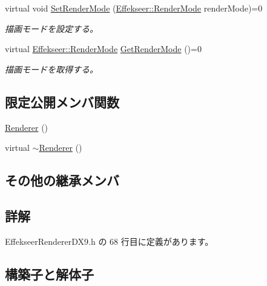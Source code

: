\begin{DoxyCompactItemize}
virtual void \mbox{\hyperlink{class_effekseer_renderer_1_1_renderer_ab0805785cad223b4a79d2d16fcd9bec8}{Set\+Render\+Mode}} (\mbox{\hyperlink{namespace_effekseer_ad1b82893021dd8e3697e46c1aa544092}{Effekseer\+::\+Render\+Mode}} render\+Mode)=0
\begin{DoxyCompactList}\small\item\em 描画モードを設定する。 \end{DoxyCompactList}\item 
virtual \mbox{\hyperlink{namespace_effekseer_ad1b82893021dd8e3697e46c1aa544092}{Effekseer\+::\+Render\+Mode}} \mbox{\hyperlink{class_effekseer_renderer_1_1_renderer_a45fd7eb7a8796aeb67467511891a48fd}{Get\+Render\+Mode}} ()=0
\begin{DoxyCompactList}\small\item\em 描画モードを取得する。 \end{DoxyCompactList}\end{DoxyCompactItemize}
\subsection*{限定公開メンバ関数}
\begin{DoxyCompactItemize}
\item 
\mbox{\hyperlink{class_effekseer_renderer_1_1_renderer_ac28b8a076c8ae3ee80e47cfa41a5b725}{Renderer}} ()
\item 
virtual \mbox{\hyperlink{class_effekseer_renderer_1_1_renderer_ad85143b942b06b4fa4741713f7bcd84b}{$\sim$\+Renderer}} ()
\end{DoxyCompactItemize}
\subsection*{その他の継承メンバ}


\subsection{詳解}


 Effekseer\+Renderer\+D\+X9.\+h の 68 行目に定義があります。



\subsection{構築子と解体子}
\mbox{\label{class_effekseer_renderer_1_1_renderer_ac28b8a076c8ae3ee80e47cfa41a5b725}} 
